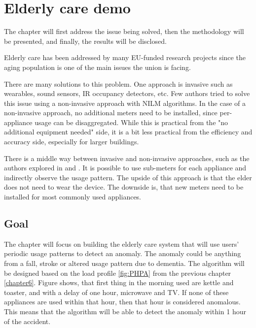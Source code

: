 
\chapter{Elderly care demo} %

\label{Chapter7} %

The chapter will first address the issue being solved,
then the methodology will be presented, and finally,
the results will be disclosed.

Elderly care has been addressed by many EU-funded research projects since the aging population is one of the main issues the union is facing. 

There are many solutions to this problem.
One approach is invasive such as wearables, sound sensors, IR occupancy detectors, etc. 
Few authors tried to solve this issue using a non-invasive approach with NILM algorithms. 
In the case of a non-invasive approach, no additional meters need to be installed, since per-appliance usage can be disaggregated.
While this is practical from the "no additional equipment needed" side, it is a bit less practical from the efficiency and accuracy side, especially for larger buildings. 

There is a middle way between invasive and non-invasive approaches, such as the authors explored in \cite{elder1} and \cite{elder2}. 
It is possible to use sub-meters for each appliance and indirectly observe the usage pattern. 
The upside of this approach is that the elder does not need to wear the device.
The downside is, that new meters need to be installed for most commonly used appliances.

\section{Goal}

The chapter will focus on building the elderly care system that will use users' periodic usage patterns to detect an anomaly.
The anomaly could be anything from a fall, stroke or altered usage pattern due to dementia. 
The algorithm will be designed based on the load profile \ref{fig:PHPA} from the previous chapter \ref{chapter6}.
Figure shows, that first thing in the morning used are kettle and toaster, and with a delay of one hour, microwave and TV. 
If none of these appliances are used within that hour, then that hour is considered anomalous.
This means that the algorithm will be able to detect the anomaly within 1 hour of the accident.

